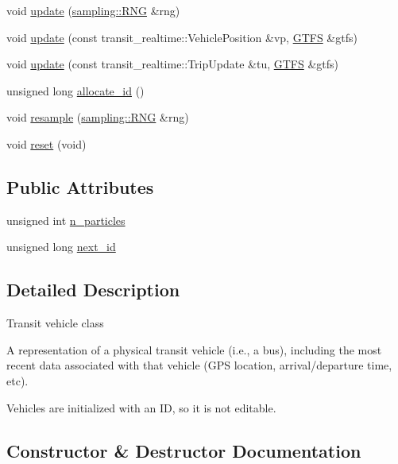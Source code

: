 \begin{DoxyCompactItemize}
void \hyperlink{classgtfs_1_1Vehicle_a4baee648ab1db5b69aa2ffef7203c2bf}{update} (\hyperlink{classsampling_1_1RNG}{sampling\+::\+R\+NG} \&rng)
\item 
void \hyperlink{classgtfs_1_1Vehicle_add9266d843398c88d3fcc22239f586a9}{update} (const transit\+\_\+realtime\+::\+Vehicle\+Position \&vp, \hyperlink{classgtfs_1_1GTFS}{G\+T\+FS} \&gtfs)
\item 
void \hyperlink{classgtfs_1_1Vehicle_ae9944f06fb0bde02f2d7c21f2dc33787}{update} (const transit\+\_\+realtime\+::\+Trip\+Update \&tu, \hyperlink{classgtfs_1_1GTFS}{G\+T\+FS} \&gtfs)
\item 
unsigned long \hyperlink{classgtfs_1_1Vehicle_aa9087e973a9821f384ec47f51bdcedc7}{allocate\+\_\+id} ()
\item 
void \hyperlink{classgtfs_1_1Vehicle_a8367fc70a64b7e596422f880dbff1193}{resample} (\hyperlink{classsampling_1_1RNG}{sampling\+::\+R\+NG} \&rng)
\item 
void \hyperlink{classgtfs_1_1Vehicle_a63474849e632ce31730b120debe50792}{reset} (void)
\end{DoxyCompactItemize}
\subsection*{Public Attributes}
\begin{DoxyCompactItemize}
\item 
unsigned int \hyperlink{classgtfs_1_1Vehicle_aa21babc8423abf92bbdf5e0748444f44}{n\+\_\+particles}
\item 
unsigned long \hyperlink{classgtfs_1_1Vehicle_aab535dd9953f9650e2adc351965779b1}{next\+\_\+id}
\end{DoxyCompactItemize}


\subsection{Detailed Description}
Transit vehicle class

A representation of a physical transit vehicle (i.\+e., a bus), including the most recent data associated with that vehicle (G\+PS location, arrival/departure time, etc).

Vehicles are initialized with an ID, so it is not editable. 

\subsection{Constructor \& Destructor Documentation}
\mbox{\label{classgtfs_1_1Vehicle_ac3f8111a611378f5f8b29f7465e48919}} 
